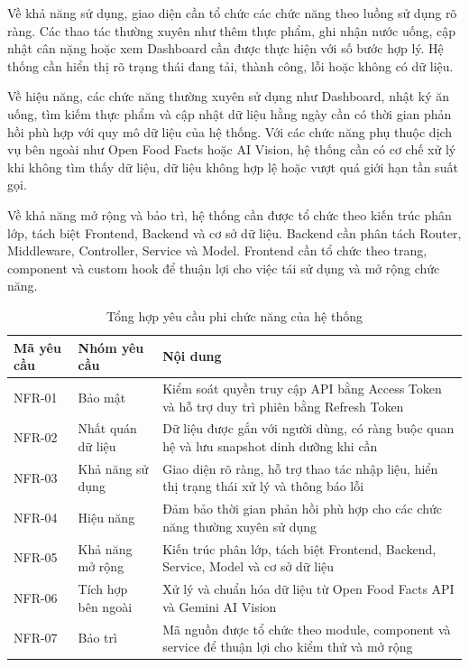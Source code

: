 Về khả năng sử dụng, giao diện cần tổ chức các chức năng theo luồng sử dụng rõ ràng. Các thao tác thường xuyên như thêm thực phẩm, ghi nhận nước uống, cập nhật cân nặng hoặc xem Dashboard cần được thực hiện với số bước hợp lý. Hệ thống cần hiển thị rõ trạng thái đang tải, thành công, lỗi hoặc không có dữ liệu.

Về hiệu năng, các chức năng thường xuyên sử dụng như Dashboard, nhật ký ăn uống, tìm kiếm thực phẩm và cập nhật dữ liệu hằng ngày cần có thời gian phản hồi phù hợp với quy mô dữ liệu của hệ thống. Với các chức năng phụ thuộc dịch vụ bên ngoài như Open Food Facts hoặc AI Vision, hệ thống cần có cơ chế xử lý khi không tìm thấy dữ liệu, dữ liệu không hợp lệ hoặc vượt quá giới hạn tần suất gọi.

Về khả năng mở rộng và bảo trì, hệ thống cần được tổ chức theo kiến trúc phân lớp, tách biệt Frontend, Backend và cơ sở dữ liệu. Backend cần phân tách Router, Middleware, Controller, Service và Model. Frontend cần tổ chức theo trang, component và custom hook để thuận lợi cho việc tái sử dụng và mở rộng chức năng.

\begin{table}[H]
\centering
\caption{Tổng hợp yêu cầu phi chức năng của hệ thống}
\begin{tabular}{|p{4cm}|p{5.5cm}|p{5.5cm}|}
\hline
\textbf{Mã yêu cầu} & \textbf{Nhóm yêu cầu} & \textbf{Nội dung} \\ \hline
NFR-01 & Bảo mật & Kiểm soát quyền truy cập API bằng Access Token và hỗ trợ duy trì phiên bằng Refresh Token \\ \hline
NFR-02 & Nhất quán dữ liệu & Dữ liệu được gắn với người dùng, có ràng buộc quan hệ và lưu snapshot dinh dưỡng khi cần \\ \hline
NFR-03 & Khả năng sử dụng & Giao diện rõ ràng, hỗ trợ thao tác nhập liệu, hiển thị trạng thái xử lý và thông báo lỗi \\ \hline
NFR-04 & Hiệu năng & Đảm bảo thời gian phản hồi phù hợp cho các chức năng thường xuyên sử dụng \\ \hline
NFR-05 & Khả năng mở rộng & Kiến trúc phân lớp, tách biệt Frontend, Backend, Service, Model và cơ sở dữ liệu \\ \hline
NFR-06 & Tích hợp bên ngoài & Xử lý và chuẩn hóa dữ liệu từ Open Food Facts API và Gemini AI Vision \\ \hline
NFR-07 & Bảo trì & Mã nguồn được tổ chức theo module, component và service để thuận lợi cho kiểm thử và mở rộng \\ \hline
\end{tabular}
\end{table}


